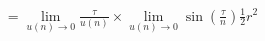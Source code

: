 \documentclass[preview]{standalone}
\begin{document}
\begin{align*}
= \lim_{u(n) \to 0} \frac {\tau} {u(n)} \times \lim_{u(n) \to 0} \sin \left( \frac {\tau} {n} \right) \frac {1} {2} r^2
\end{align*}
\end{document}

